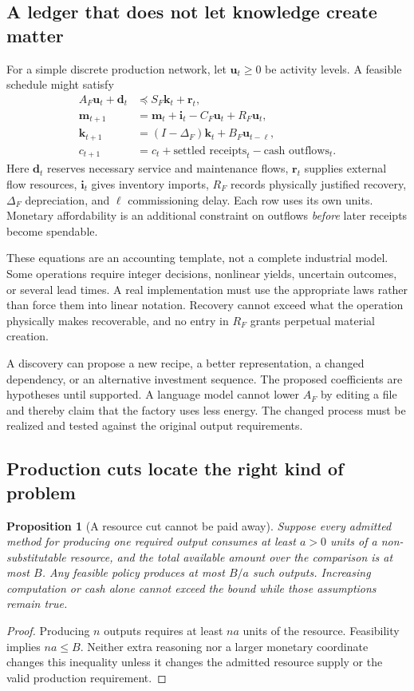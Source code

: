 \documentclass[11pt,letterpaper]{article}
\newcommand{\1}{\mathbf 1}
\newtheorem{proposition}{Proposition}[section]
\theoremstyle{remark}\newtheorem{remark}{Remark}[section]
\begin{document}
\subsection{A ledger that does not let knowledge create matter}
For a simple discrete production network, let $\mathbf u_t\ge0$ be activity levels. A feasible schedule might satisfy
\begin{align}
 A_F\mathbf u_t+\mathbf d_t&\preceq S_F\mathbf k_t+\mathbf r_t,\label{eq:flows}\\
 \mathbf m_{t+1}&=\mathbf m_t+\mathbf i_t-C_F\mathbf u_t+R_F\mathbf u_t,\label{eq:materials}\\
 \mathbf k_{t+1}&=(I-\Delta_F)\mathbf k_t+B_F\mathbf u_{t-\ell},\label{eq:assets}\\
 c_{t+1}&=c_t+\text{settled receipts}_t-\text{cash outflows}_t.\label{eq:cash}
\end{align}
Here $\mathbf d_t$ reserves necessary service and maintenance flows, $\mathbf r_t$ supplies external flow resources, $\mathbf i_t$ gives inventory imports, $R_F$ records physically justified recovery, $\Delta_F$ depreciation, and $\ell$ commissioning delay. Each row uses its own units. Monetary affordability is an additional constraint on outflows \emph{before} later receipts become spendable.

These equations are an accounting template, not a complete industrial model. Some operations require integer decisions, nonlinear yields, uncertain outcomes, or several lead times. A real implementation must use the appropriate laws rather than force them into linear notation. Recovery cannot exceed what the operation physically makes recoverable, and no entry in $R_F$ grants perpetual material creation.

A discovery can propose a new recipe, a better representation, a changed dependency, or an alternative investment sequence. The proposed coefficients are hypotheses until supported. A language model cannot lower $A_F$ by editing a file and thereby claim that the factory uses less energy. The changed process must be realized and tested against the original output requirements.

\subsection{Production cuts locate the right kind of problem}
\begin{proposition}[A resource cut cannot be paid away]\label{prop:cut}
Suppose every admitted method for producing one required output consumes at least $a>0$ units of a non-substitutable resource, and the total available amount over the comparison is at most $B$. Any feasible policy produces at most $B/a$ such outputs. Increasing computation or cash alone cannot exceed the bound while those assumptions remain true.
\end{proposition}
\begin{proof}
Producing $n$ outputs requires at least $na$ units of the resource. Feasibility implies $na\le B$. Neither extra reasoning nor a larger monetary coordinate changes this inequality unless it changes the admitted resource supply or the valid production requirement.
\end{proof}
\end{document}
